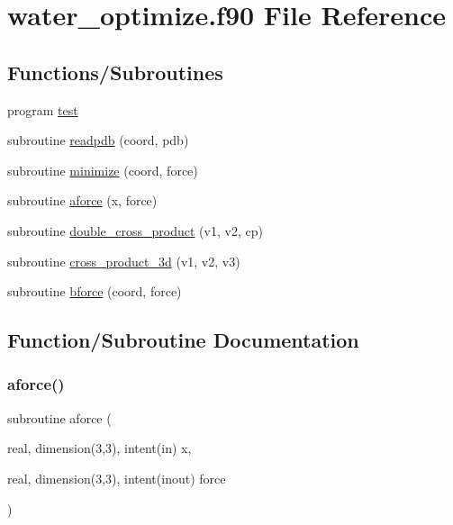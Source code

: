 \hypertarget{water__optimize_8f90}{}\section{water\+\_\+optimize.\+f90 File Reference}
\label{water__optimize_8f90}
\subsection*{Functions/\+Subroutines}
\begin{DoxyCompactItemize}
\item 
program \hyperlink{water__optimize_8f90_a9bc57b8dbe7c3e1b9db72b918a1b6bab}{test}
\item 
subroutine \hyperlink{water__optimize_8f90_aa6798098feec21c5053572f5c5043c28}{readpdb} (coord, pdb)
\item 
subroutine \hyperlink{water__optimize_8f90_adad91e5491ec76f67219e4754299ceac}{minimize} (coord, force)
\item 
subroutine \hyperlink{water__optimize_8f90_a860a9ce2ec48bea8e9cd249437c3269d}{aforce} (x, force)
\item 
subroutine \hyperlink{water__optimize_8f90_ac09d0de3f934f24e9272c2f52a8eb350}{double\+\_\+cross\+\_\+product} (v1, v2, cp)
\item 
subroutine \hyperlink{water__optimize_8f90_a04c9baacf7d82c67687c579db9ec3446}{cross\+\_\+product\+\_\+3d} (v1, v2, v3)
\item 
subroutine \hyperlink{water__optimize_8f90_a1c61ecd9ef781071e23a3290f6371c4d}{bforce} (coord, force)
\end{DoxyCompactItemize}


\subsection{Function/\+Subroutine Documentation}
\mbox{\label{water__optimize_8f90_a860a9ce2ec48bea8e9cd249437c3269d}} 
\subsubsection{\texorpdfstring{aforce()}{aforce()}}
{\footnotesize\ttfamily subroutine aforce (\begin{DoxyParamCaption}\item[{real, dimension(3,3), intent(in)}]{x,  }\item[{real, dimension(3,3), intent(inout)}]{force }\end{DoxyParamCaption})}

